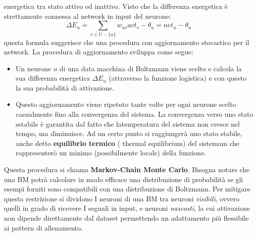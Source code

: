 \documentclass{article}
\begin{document}
energetica tra stato attivo ed inattivo. Visto che la differenza energetica è strettamente connessa
al network in input del neurone:
$$\Delta E_u=\sum_{v\in U-\{u\}}w_{uv}act_v-\theta_u=net_u-\theta_u$$
questa formula suggerisce che una procedura con aggiornamento stocastico per il network.
La procedura di aggiornamento sviluppa come segue:
\begin{itemize}
    \item Un neurone $u$ di una data macchina di Boltzmann viene scelto e calcola
          la sua differenza energetica $\Delta E_u$ (attraverso la funzione logistica) e
          con questo la sua probabilità di attivazione.
    \item Questo aggiornamento viene ripetuto tante volte per ogni neurone scelto
          casualmente fino alla convergenza del sistema. La convergenza verso uno stato sstabile
          è garantita dal fatto che latemperatura del sistema non cresce nel tempo, ma diminuisce.
          Ad un certo punto si raggiungerà uno stato stabile, anche detto \textbf{equilibrio termico} (
          thermal equilibrium) del sistemam che rappresenterò un minimo (possibilmente locale)
          della funzione.
\end{itemize}
Questa procedura si chiama \textbf{Markov-Chain Monte Carlo}.
\newline\newline
Bisogna notare che una BM potrà calcolare in modo efficace una distribuzione di probabilità se
gli esempi forniti sono compatibili con una distribuzione di Boltzmann. Per mitigare questa
restrizione si dividono I neuroni di una BM tra neuroni \textit{visibili}, ovvero quelli
in grado di ricevere I segnali in input, e neuroni \textit{nascosti}, la cui attivazione
non dipende direttamente dal dataset permettendo un adattamento più flessibile ai pattern
di allenamento.
\end{document}
